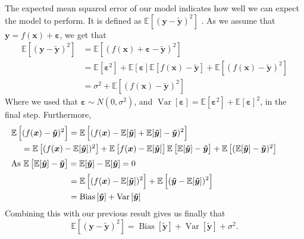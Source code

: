 \documentclass{article}
\DeclareMathOperator*{\Bias}{Bias}
\DeclareMathOperator*{\Var}{Var}
\begin{document}
The expected mean squared error of our model indicates how well we can expect the model to perform. It is defined as $\mathbb{E} \left[ (\boldsymbol{y} - \boldsymbol{\tilde{y}})^2 \right]$ \cite[p.~34]{james2021introduction}. As we assume that $\boldsymbol{y} = f(\boldsymbol{x}) + \boldsymbol{\varepsilon}$, we get that
\begin{align*}
    \mathbb{E} \left[ (\boldsymbol{y} - \boldsymbol{\tilde{y}})^2 \right] &=
    \mathbb{E} \left[ (f(\boldsymbol{x}) + \boldsymbol{\varepsilon} - \boldsymbol{\tilde{y}})^2 \right] \\
    &= \mathbb{E} \left[ \boldsymbol{\varepsilon}^2 \right] + \mathbb{E} \left[ \boldsymbol{\varepsilon} \right] \mathbb{E} \left[ f(\boldsymbol{x}) - \boldsymbol{\tilde{y}} \right] + \mathbb{E} \left[ (f(\boldsymbol{x}) - \boldsymbol{\tilde{y}})^2 \right] \\
    &= \sigma^2 + \mathbb{E}\left[ (f(\boldsymbol{x}) - \boldsymbol{\tilde{y}})^2 \right]
\end{align*}
Where we used that $\boldsymbol{\varepsilon} \sim N(0, \sigma^2)$, and $\Var[\boldsymbol{\varepsilon}] = \mathbb{E}\left[ \boldsymbol{\varepsilon}^2 \right] + \mathbb{E}[\boldsymbol{\varepsilon}]^2$, in the final step. Furthermore,
\begin{align*}
    \mathbb{E}\left[ (f(\boldsymbol{x}) - \boldsymbol{\tilde{y}})^2 \right] &= \mathbb{E}\left[ (f(\boldsymbol{x}) - \mathbb{E}[ \boldsymbol{\tilde{y}}] + \mathbb{E}[ \boldsymbol{\tilde{y}}] - \boldsymbol{\tilde{y}})^2 \right] \\
    \noalign{$= \mathbb{E}\left[ (f(\boldsymbol{x}) - \mathbb{E}[ \boldsymbol{\tilde{y}}])^2 \right] 
    + \mathbb{E}\left[ f(\boldsymbol{x}) - \mathbb{E}[ \boldsymbol{\tilde{y}}]\right] \mathbb{E}\left[ \mathbb{E}[ \boldsymbol{\tilde{y}}] - \boldsymbol{\tilde{y}} \right] 
    + \mathbb{E}\left[ (\mathbb{E}[ \boldsymbol{\tilde{y}}] - \boldsymbol{\tilde{y}})^2 \right]$}
    \intertext{As $\mathbb{E}\left[ \mathbb{E}[ \boldsymbol{\tilde{y}}] - \boldsymbol{\tilde{y}} \right] = \mathbb{E}[ \boldsymbol{\tilde{y}}] - \mathbb{E}[ \boldsymbol{\tilde{y}}] = 0$}
    &= \mathbb{E}\left[ (f(\boldsymbol{x}) - \mathbb{E}[ \boldsymbol{\tilde{y}}])^2 \right] 
    + \mathbb{E}\left[ (\boldsymbol{\tilde{y}} - \mathbb{E}[ \boldsymbol{\tilde{y}}])^2 \right] \\
    &= \Bias\left[ \boldsymbol{\tilde{y}} \right] + \Var\left[ \boldsymbol{\tilde{y}} \right]
\end{align*}
Combining this with our previous result gives us finally that
\begin{equation*}
    \mathbb{E}\left[ (\boldsymbol{y} - \boldsymbol{\tilde{y}})^2 \right] = \Bias\left[ \boldsymbol{\tilde{y}} \right] + \Var\left[ \boldsymbol{\tilde{y}} \right] + \sigma^2.
\end{equation*}
\end{document}
